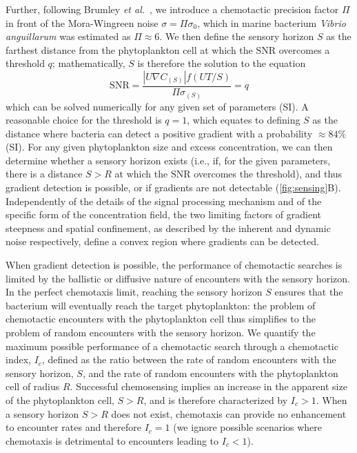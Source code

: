\documentclass[9pt,twocolumn,twoside]{pnas-new}
\newcommand{\SNR}{\mathrm{SNR}}
\begin{document}
Further, following Brumley \textit{et al.}~\cite{brumley2019bacteria}, we introduce a chemotactic precision factor $\Pi$ in front of the Mora-Wingreen noise $\sigma = \Pi\sigma_0$, which in marine bacterium \textit{Vibrio anguillarum} was estimated as $\Pi\approx6$.
We then define the sensory horizon $S$ as the farthest distance from the phytoplankton cell at which the $\SNR$ overcomes a threshold $q$; mathematically, $S$ is therefore the solution to the equation
\begin{equation}\label{eq:snr}
  \SNR = \dfrac{|U\nabla C_{(S)}|f(UT/S)}{\Pi\sigma_{(S)}} = q
\end{equation}
which can be solved numerically for any given set of parameters (SI).
A reasonable choice for the threshold is $q=1$, which equates to defining $S$ as the distance where bacteria can detect a positive gradient with a probability $\approx 84\%$ (SI).
For any given phytoplankton size and excess concentration, we can then determine whether a sensory horizon exists (i.e., if, for the given parameters, there is a distance $S>R$ at which the $\SNR$ overcomes the threshold), and thus gradient detection is possible, or if gradients are not detectable (\autoref{fig:sensing}B).
Independently of the details of the signal processing mechanism and of the specific form of the concentration field, the two limiting factors of gradient steepness and spatial confinement, as described by the inherent and dynamic noise respectively, define a convex region where gradients can be detected.

When gradient detection is possible, the performance of chemotactic searches is limited by the ballistic or diffusive nature of encounters with the sensory horizon.
In the perfect chemotaxis limit, reaching the sensory horizon $S$ ensures that the bacterium will eventually reach the target phytoplankton: the problem of chemotactic encounters with the phytoplankton cell thus simplifies to the problem of random encounters with the sensory horizon.
We quantify the maximum possible performance of a chemotactic search through a chemotactic index, $I_c$, defined as the ratio between the rate of random encounters with the sensory horizon, $S$, and the rate of random encounters with the phytoplankton cell of radius $R$.
Successful chemosensing implies an increase in the apparent size of the phytoplankton cell, $S>R$, and is therefore characterized by $I_c>1$.
When a sensory horizon $S>R$ does not exist, chemotaxis can provide no enhancement to encounter rates and therefore $I_c=1$ (we ignore possible scenarios where chemotaxis is detrimental to encounters leading to $I_c<1$).
\end{document}
